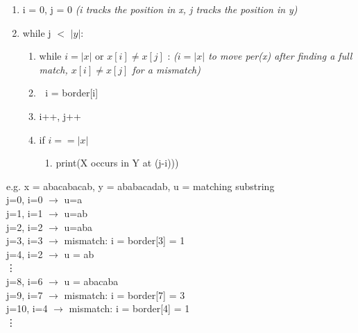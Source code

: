 \begin{enumerate}[label=\Alph*]
    \item i = 0, j = 0 \emph{(i tracks the position in x, j tracks the position in y)}
    \item while j $<$ $|y|$:
\begin{enumerate}[label=\arabic*]
    \item while $i=|x|$ or $x[i]\neq x[j]$ : \emph{($i=|x|$ to move per(x) after finding a full match, $x[i]\neq x[j]$ for a mismatch)}
    \item[ ] $\;$ i = border[i]    
    \item i++, j++
    \item if $i==|x|$
    \begin{enumerate}
        \item print(X occurs in Y at (j-i)))
    \end{enumerate}
\end{enumerate}    
\end{enumerate}
e.g.
x = abacabacab, y = ababacadab, u = matching substring \\
j=0, i=0 $\rightarrow$ u=a \\
j=1, i=1 $\rightarrow$ u=ab \\
j=2, i=2 $\rightarrow$ u=aba \\
j=3, i=3 $\rightarrow$ mismatch: i = border[3] = 1 \\
j=4, i=2 $\rightarrow$ u = ab \\
\vdots \\
j=8, i=6 $\rightarrow$ u = abacaba \\
j=9, i=7  $\rightarrow$ mismatch: i = border[7] = 3 \\
j=10, i=4 $\rightarrow$ mismatch: i = border[4] = 1 \\
\vdots


